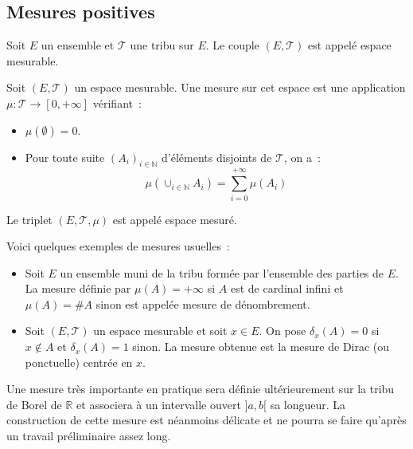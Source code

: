 \subsection{Mesures positives}
\begin{defn}
Soit $E$ un ensemble et  $\mathcal{T}$ une tribu sur
$E$. Le couple $(E, \mathcal{T})$ est appelé espace mesurable. 
\end{defn}
\begin{mandatory}
\begin{defn}
Soit $(E, \mathcal{T})$ un espace mesurable. Une mesure sur cet espace
est une application $\mu : \mathcal{T} \to [0, +\infty]$ vérifiant~:
\begin{itemize}
\item $\mu(\emptyset) = 0$.
\item Pour toute suite $(A_i)_{i \in \mathbb{N}}$ d'éléments disjoints
  de  $\mathcal{T}$, on a~:
\[
\mu \left ( \cup_{i \in \mathbb{N}} A_i \right ) = \sum_{i
  =0}^{+\infty} \mu(A_i)
\]
\end{itemize}
\end{defn}
Le triplet $(E, \mathcal{T}, \mu)$ est appelé espace mesuré.
\end{mandatory} 

Voici quelques exemples de mesures usuelles~:
\begin{itemize}
\item Soit $E$ un ensemble muni de la tribu formée par l'ensemble des
  parties de $E$. La mesure définie par $\mu(A) = +\infty$ si $A$ est
  de cardinal infini et $\mu(A)= \#A$ sinon est appelée mesure de
  dénombrement.
\item Soit $(E, \mathcal{T})$ un espace mesurable et soit $x \in
  E$. On pose $\delta_x(A) = 0$ si $x \notin A$ et $\delta_x(A) = 1$
  sinon. La mesure obtenue est la mesure de Dirac (ou ponctuelle)
  centrée en $x$.
\end{itemize}
Une mesure très importante en pratique sera définie ultérieurement sur la tribu
de Borel de $\mathbb{R}$ et associera à un intervalle ouvert $]a,b[$ sa
longueur. La construction de cette mesure est néanmoins délicate et ne
pourra se faire qu'après un travail préliminaire assez long. 


